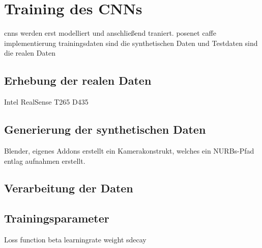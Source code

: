 
\section{Training des CNNs}
cnns werden erst modelliert und anschließend traniert.
posenet caffe implementierung
trainingsdaten sind die synthetischen Daten und Testdaten sind die realen Daten


\subsection{Erhebung der realen Daten}
Intel RealSense T265 D435

\subsection{Generierung der synthetischen Daten}
Blender,
eigenes Addons erstellt ein Kamerakonstrukt, welches ein NURBs-Pfad entlag aufnahmen erstellt.

\subsection{Verarbeitung der Daten}


\subsection{Trainingsparameter}

Loss function beta
learningrate
weight sdecay
